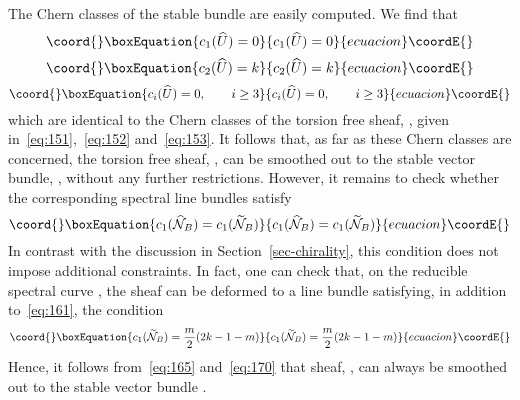 \documentclass[a4paper,12pt]{article}
\numberwithin{equation}{section}
\def\cC{{\mathcal C}}
\def\cN{{\mathcal N}}
\theoremstyle{plain}
\begin{document}
The Chern classes of the stable \coordHE{} bundle \coordHE{}
are easily computed. We find that
\begin{equation}\coord{}\boxEquation{
c_{1}(\widehat{U})=0
\label{eq:166}
}{
c_{1}(\widehat{U})=0
}{ecuacion}\coordE{}\end{equation}
\begin{equation}\coord{}\boxEquation{
c_{2}(\widehat{U})=k
\label{eq:167}
}{
c_{2}(\widehat{U})=k
}{ecuacion}\coordE{}\end{equation}
\begin{equation}\coord{}\boxEquation{
c_{i}(\widehat{U})=0, \qquad i\geq3
\label{eq:168}
}{
c_{i}(\widehat{U})=0, \qquad i\geq3
}{ecuacion}\coordE{}\end{equation}
which are identical to the Chern classes of the torsion free sheaf,
\coordHE{}, given in~\eqref{eq:151},~\eqref{eq:152} and~\eqref{eq:153}. It
follows that, as far as these Chern classes are concerned, the torsion free
sheaf, \coordHE{}, can be smoothed out to the stable vector bundle,
\coordHE{}, without any further restrictions. However, it
remains to check whether the corresponding spectral line bundles satisfy
\begin{equation}\coord{}\boxEquation{
c_{1}(\widehat{\cN}_{B})=c_{1}(\widetilde{\cN}_{B})
\label{eq:169}
}{
c_{1}(\widehat{\cN}_{B})=c_{1}(\widetilde{\cN}_{B})
}{ecuacion}\coordE{}\end{equation}
In contrast with the discussion in Section~\ref{sec-chirality}, this
condition does not impose additional constraints. In fact, one can check 
that, on the reducible spectral curve \myHighlight{$\widetilde{\cC}$}\coordHE{}, the sheaf
\coordHE{} can be deformed to a line bundle satisfying, in addition
to~\eqref{eq:161}, the condition
\begin{equation}\coord{}\boxEquation{
c_{1}(\widetilde{\cN}_{B})= \frac{m}{2}(2k -1 -m)
\label{eq:170}
}{
c_{1}(\widetilde{\cN}_{B})= \frac{m}{2}(2k -1 -m)
}{ecuacion}\coordE{}\end{equation}
Hence, it follows from~\eqref{eq:165} and~\eqref{eq:170} that
sheaf, \coordHE{}, can always be smoothed out to the stable 
\coordHE{} vector bundle \coordHE{}.
\end{document}
